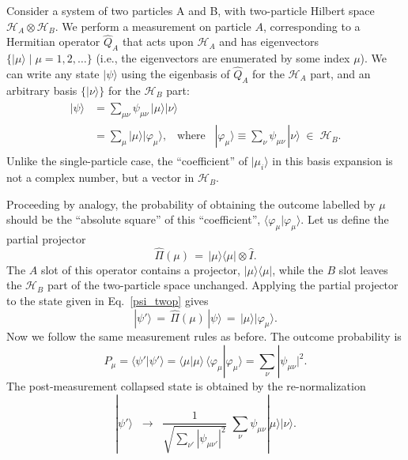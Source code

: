 \documentclass[pra,12pt]{revtex4-2}
\begin{document}
Consider a system of two particles A and B, with two-particle Hilbert
space $\mathscr{H}_A \otimes \mathscr{H}_B$.  We perform a measurement
on particle $A$, corresponding to a Hermitian operator $\hat{Q}_A$
that acts upon $\mathscr{H}_A$ and has eigenvectors $\{|\mu\rangle\;
|\; \mu = 1, 2, \dots\}$ (i.e., the eigenvectors are enumerated by
some index $\mu$).  We can write any state $|\psi\rangle$ using the
eigenbasis of $\hat{Q}_A$ for the $\mathscr{H}_A$ part, and an
arbitrary basis $\{|\nu\rangle\}$ for the $\mathscr{H}_B$ part:
\begin{align}
  \begin{aligned}
    |\psi\rangle &= \sum_{\mu\nu}
    \psi_{\mu\nu}\, |\mu\rangle |\nu\rangle \\
    &= \sum_\mu |\mu\rangle |\varphi_\mu \rangle,
    \;\;\;\mathrm{where}\;\;\;
    |\varphi_\mu\rangle\equiv \sum_\nu \psi_{\mu\nu}\,|\nu\rangle
    \;\in\; \mathscr{H}_B.
  \end{aligned}
  \label{psi_twop}
\end{align}
Unlike the single-particle case, the ``coefficient'' of
$|\mu_i\rangle$ in this basis expansion is not a complex number, but a
vector in $\mathscr{H}_B$.

Proceeding by analogy, the probability of obtaining the outcome
labelled by $\mu$ should be the ``absolute square'' of this
``coefficient'', $\langle\varphi_\mu|\varphi_\mu\rangle$.  Let us
define the partial projector
\begin{equation}
  \hat{\Pi}(\mu) \,=\, |\mu\rangle\langle \mu| \otimes  \hat{I}.
\end{equation}
The $A$ slot of this operator contains a projector,
$|\mu\rangle\langle \mu|$, while the $B$ slot leaves the
$\mathscr{H}_B$ part of the two-particle space unchanged.  Applying
the partial projector to the state given in Eq.~\eqref{psi_twop} gives
\begin{equation}
  |\psi'\rangle \,=\, \hat{\Pi}(\mu)\, |\psi\rangle
  \,=\, |\mu\rangle |\varphi_\mu\rangle.
\end{equation}
Now we follow the same measurement rules as before.  The outcome
probability is
\begin{equation}
  P_\mu = \langle\psi'|\psi'\rangle
  = \langle \mu|\mu\rangle\, \langle \varphi_\mu|\varphi_\mu\rangle
  = \sum_\nu |\psi_{\mu\nu}|^2.
\end{equation}
The post-measurement collapsed state is obtained by the
re-normalization
\begin{equation}
  |\psi'\rangle
  \;\;\rightarrow\;\;
  \frac{1}{\sqrt{\sum_{\nu'} |\psi_{\mu\nu'}|^2}}\;
  \sum_{\nu} \psi_{\mu\nu} |\mu\rangle |\nu\rangle.
\end{equation}
\end{document}
